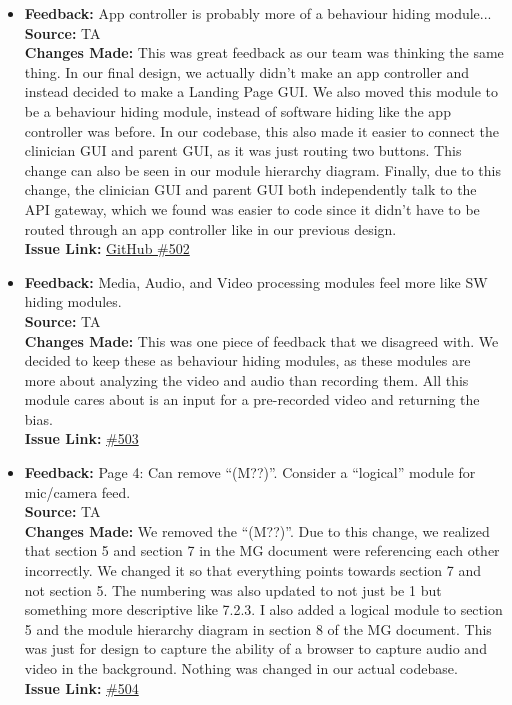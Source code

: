 \documentclass{article}
\begin{document}
\begin{itemize}
    \item
      \textbf{Feedback:} App controller is probably more of a behaviour hiding module... \\
      \textbf{Source:} TA \\
      \textbf{Changes Made:} This was great feedback as our team was thinking the same thing. In our final design, we actually didn’t make an app controller and instead decided to make a Landing Page GUI. We also moved this module to be a behaviour hiding module, instead of software hiding like the app controller was before. In our codebase, this also made it easier to connect the clinician GUI and parent GUI, as it was just routing two buttons. This change can also be seen in our module hierarchy diagram. Finally, due to this change, the clinician GUI and parent GUI both independently talk to the API gateway, which we found was easier to code since it didn’t have to be routed through an app controller like in our previous design. \\
      \textbf{Issue Link:} \href{https://github.com/parishanizam/TeleHealth/issues/502}{GitHub \#502}
    
    \item
      \textbf{Feedback:} Media, Audio, and Video processing modules feel more like SW hiding modules. \\
      \textbf{Source:} TA \\
      \textbf{Changes Made:} This was one piece of feedback that we disagreed with. We decided to keep these as behaviour hiding modules, as these modules are more about analyzing the video and audio than recording them. All this module cares about is an input for a pre-recorded video and returning the bias. \\
      \textbf{Issue Link:} \href{https://github.com/parishanizam/TeleHealth/issues/503}{\#503}
    
    \item
      \textbf{Feedback:} Page 4: Can remove “(M??)”. Consider a “logical” module for mic/camera feed. \\
      \textbf{Source:} TA \\
      \textbf{Changes Made:} We removed the “(M??)”. Due to this change, we realized that section 5 and section 7 in the MG document were referencing each other incorrectly. We changed it so that everything points towards section 7 and not section 5. The numbering was also updated to not just be 1 but something more descriptive like 7.2.3. I also added a logical module to section 5 and the module hierarchy diagram in section 8 of the MG document. This was just for design to capture the ability of a browser to capture audio and video in the background. Nothing was changed in our actual codebase. \\
      \textbf{Issue Link:} \href{https://github.com/parishanizam/TeleHealth/issues/504}{\#504}
    

\end{itemize}
\end{document}
